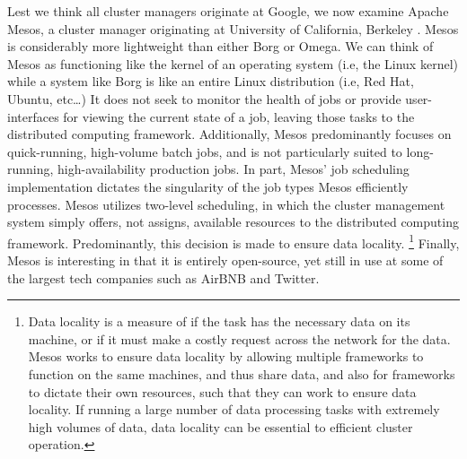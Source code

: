 Lest we think all cluster managers originate at Google, we now examine Apache
Mesos, a cluster manager originating at University of California, Berkeley
\cite{mesos}. Mesos is considerably more lightweight than either Borg or Omega.
We can think of Mesos as functioning like the kernel of an operating system
(i.e, the Linux kernel) while a system like Borg is like an entire Linux
distribution (i.e, Red Hat, Ubuntu, etc\ldots)
It does not seek to monitor the health of jobs or provide user-interfaces for viewing the
current state of a job, leaving those tasks to the distributed computing
framework. Additionally, Mesos predominantly focuses on quick-running,
high-volume batch jobs, and is not particularly suited to long-running,
high-availability production jobs. In part, Mesos'
job scheduling implementation dictates the singularity of the job types
Mesos efficiently processes. Mesos utilizes two-level scheduling, in which the
cluster management system simply offers, not assigns, available
resources to the distributed computing framework. Predominantly, this decision
is made to ensure data locality. \footnote{Data locality is a measure
of if the task has the necessary data on its machine, or if it must make a
costly request across the network for the data. Mesos works to ensure data
locality by allowing multiple frameworks to function on the same machines, and
thus share data, and also for frameworks to dictate their own resources, such
that they can work to ensure data locality. If running a large number of data
processing tasks with extremely high volumes of data, data locality can be
essential to efficient cluster operation.} Finally, Mesos is interesting in
that it is entirely open-source, yet still in use at some of the largest tech
companies such as AirBNB and Twitter.

